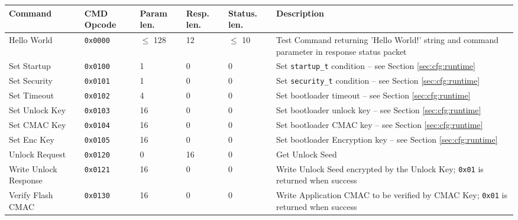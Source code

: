 

\begin{table*}[!ht]
  \hspace*{-4cm}
  \begin{tabular}{| p{3cm} | p{1.5cm} | p{1cm} | p{1cm} | p{1cm} | p{4.5cm} | }
      \hline
      \rowcolor{SeaGreen3!30!} {\bf Command} & {\bf CMD Opcode} & {\bf Param len.} & {\bf Resp. len.} & {\bf Status. len.} & {\bf Description} \\
      \hline
      \hline
      Hello World & \texttt{0x0000} & $\leq$ 128 & 12 & $\leq$ 10 & Test Command returning 'Hello World!' string and command parameter in response status packet \\
      \hline
      Set Startup & \texttt{0x0100} & 1 & 0 & 0 & Set \texttt{startup\_t} condition -- see Section \ref{sec:cfg:runtime} \\
      \hline
      Set Security & \texttt{0x0101} & 1 & 0 & 0 & Set \texttt{security\_t} condition -- see Section \ref{sec:cfg:runtime} \\
      \hline
      Set Timeout & \texttt{0x0102} & 4 & 0 & 0 & Set bootloader timeout -- see Section \ref{sec:cfg:runtime} \\
      \hline
      Set Unlock Key & \texttt{0x0103} & 16 & 0 & 0 & Set bootloader unlock key -- see Section \ref{sec:cfg:runtime} \\
      \hline
      Set CMAC Key & \texttt{0x0104} & 16 & 0 & 0 & Set bootloader CMAC key -- see Section \ref{sec:cfg:runtime} \\
      \hline
      Set Enc Key & \texttt{0x0105} & 16 & 0 & 0 & Set bootloader Encryption key -- see Section \ref{sec:cfg:runtime} \\
      \hline
      Unlock Request & \texttt{0x0120} & 0 & 16 & 0 & Get Unlock Seed \\
      \hline
      Write Unlock Response & \texttt{0x0121} & 16 & 0 & 0 & Write Unlock Seed encrypted by the Unlock Key; \texttt{0x01} is returned when success\\
      \hline
      Verify Flash CMAC & \texttt{0x0130} & 16 & 0 & 0 & Write Application CMAC to be verified by CMAC Key; \texttt{0x01} is returned when success\\
      \hline
  \end{tabular}
  \label{tab:specCmd}
 \end{table*}
   
